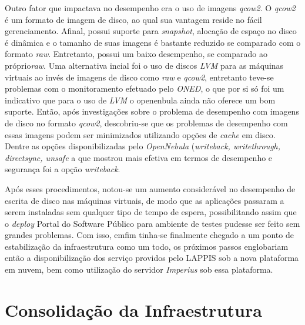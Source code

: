 Outro fator que impactava no desempenho era o uso de imagens \textit{qcow2}. O \textit{qcow2} é um formato de imagem de disco, ao qual sua vantagem reside no fácil gerenciamento. Afinal, possui suporte para \textit{snapshot}, alocação de espaço no disco é dinâmica e o tamanho de suas imagens é bastante reduzido se comparado com o formato \textit{raw}. Entretanto, possui um baixo desempenho, se comparado ao  próprio\textit{raw}. Uma alternativa incial foi o uso de discos \textit{LVM} para as máquinas virtuais ao invés de imagens de disco como \textit{raw} e \textit{qcow2}, entretanto teve-se problemas com o monitoramento efetuado pelo \textit{ONED}, o que por si só foi um indicativo que para o uso de \textit{LVM} o openenbula ainda não oferece um bom suporte. Então, após investigações sobre o problema de desempenho com imagens de disco no formato \textit{qcow2}, descobriu-se que os problemas de desempenho com essas imagens podem ser minimizados utilizando opções de \textit{cache} em disco. Dentre as opções disponibilizadas pelo \textit{OpenNebula} (\textit{writeback, writethrough, directsync, unsafe} a que mostrou mais efetiva em termos de desempenho e segurança foi a opção \textit{writeback}.

Após esses procedimentos, notou-se um aumento considerável no desempenho de escrita de disco nas máquinas virtuais, de modo que as aplicações passaram a serem instaladas sem qualquer tipo de tempo de espera, possibilitando assim que o \textit{deploy}  Portal do Software Público para ambiente de testes pudesse ser feito sem grandes problemas. Com isso, emfim tinha-se finalmente chegado a um ponto de estabilização da infraestrutura como um todo, os próximos passos englobariam então a disponibilização dos serviço providos pelo LAPPIS sob a nova plataforma em nuvem, bem como utilização do servidor \textit{Imperius} sob essa plataforma.  

\section{Consolidação da Infraestrutura}

